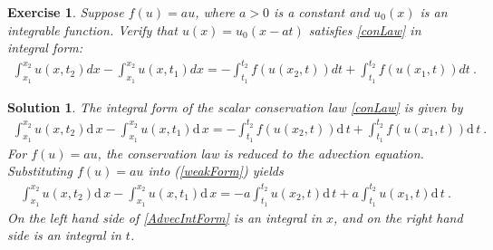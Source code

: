 \documentclass[10pt,letterpaper]{article}
\newcommand{\dif}[1][]{\mathrm{d} {#1}\,}
\newcommand{\frb}[1]{ \left(  {#1} \right) }
\theoremstyle{break}
\newtheorem{exercise}{Exercise}
\newtheorem{mysolution}{Solution}
\newtheorem*{mysolutioninformation}{Solution Information}
\newenvironment{solution}{\begin{mysolution}}{\end{mysolution}} \newenvironment{solutioninformation}{\begin{mysolutioninformation}}{\end{mysolutioninformation}}
\begin{document}
\begin{exercise}
	Suppose $f\!\left(u\right)=au$, where $a>0$ is a constant and $u_{0}\!\left(x\right)$ is an integrable function. Verify that $u(x)=u_{0}(x-at)$ satisfies \eqref{conLaw} in integral form:
	\begin{gather} \label{weakForm}
		\int_{x_{1}}^{x_{2}}u\!\left(x,t_{2}\right) dx
		-
		\int_{x_{1}}^{x_{2}}u\!\left(x,t_{1}\right)dx
		=
		-
		\int_{t_{1}}^{t_{2}}f\!\left(u\!\left(x_{2},t\right)\right)dt
		+
		\int_{t_{1}}^{t_{2}}f\!\left(u\!\left(x_{1},t\right)\right)dt 
		\ .
	\end{gather}%
\end{exercise}

\begin{solution}
	The integral form of the scalar conservation law \eqref{conLaw} is given by 
	\begin{gather} 
		\int_{x_{1}}^{x_{2}}u\frb{x,t_{2}} \dif x
				-\int_{x_{1}}^{x_{2}}u\frb{x,t_{1}} \dif x
			=-\int_{t_{1}}^{t_{2}}f\frb{u\frb{x_{2},t}} \dif t
				+\int_{t_{1}}^{t_{2}}f\frb{u\frb{x_{1},t}} \dif t\ .
	\end{gather}
	For $f(u)=au$, the conservation law is reduced to the advection equation. Substituting $f\!\left(u\right)=au$ into (\ref{weakForm}) yields
	\begin{gather} \label{AdvecIntForm}
		\int_{x_{1}}^{x_{2}}u\frb{x,t_{2}} \dif x
				-\int_{x_{1}}^{x_{2}}u\frb{x,t_{1}} \dif x
			=-a \int_{t_{1}}^{t_{2}} u\frb{x_{2},t} \dif t
				+a\int_{t_{1}}^{t_{2}} u\frb{x_{1},t} \dif t\  .
	\end{gather}
	On the left hand side of \eqref{AdvecIntForm} is an integral in $x$, and on the right hand side is an integral in $t$.
	

\end{solution}
\end{document}

